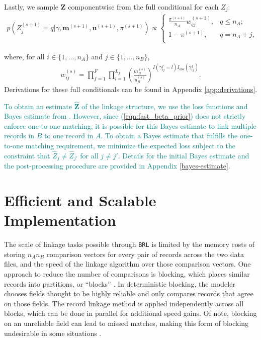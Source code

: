 \documentclass[ba]{imsart}
\begin{document}
Lastly, we sample $\bm{Z}$ componentwise from the full conditional for each $Z_j$:
\begin{align}
	\label{eqn:z_full_conditional}
	p\left(Z_j^{(s+1)}  = q|\gamma, \bm{m}^{(s+1)}, \bm{u}^{(s+1)},  \pi^{(s+1)}\right) \propto
	\begin{cases} 
		\frac{\pi^{(s+1)}}{n_A} w_{qj}^{(s+1)},  & q \leq n_A; \\
		1 - \pi^{(s+1)}, & q  = n_A + j, \\
	\end{cases}
\end{align}

where, for all $i \in \{1, \ldots, n_A\}$ and $j \in \{1, \ldots, n_B\}$, 
\begin{align}
	\label{eqn:fs_weight}
	w_{ij}^{(s)} = \prod_{f=1}^{F}\prod_{l = 1}^{L_f} \left(\frac{m_{fl}^{(s)}}{u_{fl}^{(s)}}\right)^{I(\gamma_{ij}^f = l)I_{obs}(\gamma_{ij}^f)}.
\end{align}
Derivations for these full conditionals can be found in Appendix \ref{app:derivations}.

\textcolor{teal}{To obtain an estimate $\hat{\bm{Z}}$ of the linkage structure, we use the loss functions and Bayes estimate from \cite{sadinle_bayesian_2017}. However, since (\ref{eqn:fast_beta_prior}) does not strictly enforce one-to-one matching, it is possible for this Bayes estimate to link multiple records in $B$ to one record in $A$. To obtain a Bayes estimate that fulfills the one-to-one matching requirement, we minimize the expected loss subject to the constraint that $\hat{Z}_j \neq \hat{Z}_{j'}$ for all $j \neq j'$. Details for the initial Bayes estimate and the post-processing procedure are provided in Appendix \ref{bayes-estimate}.}

\section{Efficient and Scalable Implementation}
\label{sec:efficiency}

The scale of linkage tasks possible through \texttt{BRL} is limited by the memory costs of storing $n_A  n_B$ comparison vectors for every pair of records across the two data files, and the speed of the linkage algorithm over those comparison vectors. One approach to reduce the number of comparisons is blocking, which places similar records into partitions, or ``blocks'' \citep{christen2019data}. In deterministic blocking, the modeler chooses fields thought to be highly reliable and only compares records that agree on those fields. The record linkage method is  applied independently across all blocks, which can be done in parallel for additional speed gains. Of note, blocking on an unreliable field can lead to missed matches, making this form of blocking undesirable in some situations \citep{steorts_comparison_2014}.
\end{document}
